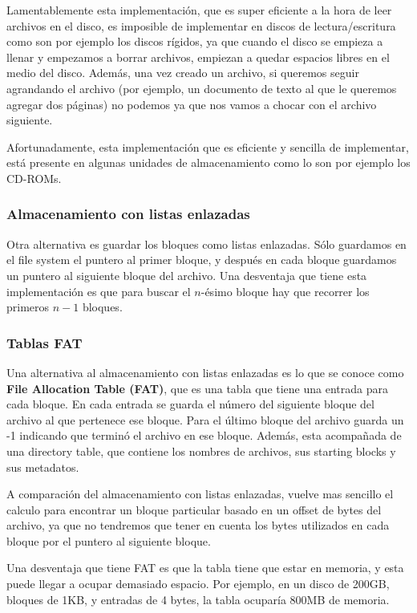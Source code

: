 \documentclass{article}
\begin{document}
Lamentablemente esta implementaci\'on, que es super eficiente a la hora de leer archivos en el disco, es imposible de implementar en discos de lectura/escritura como son por ejemplo los discos r\'igidos, ya que cuando el disco se empieza a llenar y empezamos a borrar archivos, empiezan a quedar espacios libres en el medio del disco. Adem\'as, una vez creado un archivo, si queremos seguir agrandando el archivo (por ejemplo, un documento de texto al que le queremos agregar dos p\'aginas) no podemos ya que nos vamos a chocar con el archivo siguiente.

Afortunadamente, esta implementaci\'on que es eficiente y sencilla de implementar, est\'a presente en algunas unidades de almacenamiento como lo son por ejemplo los CD-ROMs.

\subsubsection{Almacenamiento con listas enlazadas}

Otra alternativa es guardar los bloques como listas enlazadas. S\'olo guardamos en el file system el puntero al primer bloque, y despu\'es en cada bloque guardamos un puntero al siguiente bloque del archivo. Una desventaja que tiene esta implementaci\'on es que para buscar el $n$-\'esimo bloque hay que recorrer los primeros $n-1$ bloques.

\subsubsection{Tablas FAT}

Una alternativa al almacenamiento con listas enlazadas es lo que se conoce como \textbf{File Allocation Table (FAT)}, que es una tabla que tiene una entrada para cada bloque. En cada entrada se guarda el n\'umero del siguiente bloque del archivo al que pertenece ese bloque. Para el \'ultimo bloque del archivo guarda un -1 indicando que termin\'o el archivo en ese bloque. Además, esta acompañada de una directory table, que contiene los nombres de archivos, sus starting blocks y sus metadatos.

A comparación del almacenamiento con listas enlazadas, vuelve mas sencillo el calculo para encontrar un bloque particular basado en un offset de bytes del archivo, ya que no tendremos que tener en cuenta los bytes utilizados en cada bloque por el puntero al siguiente bloque.

Una desventaja que tiene FAT es que la tabla tiene que estar en memoria, y esta puede llegar a ocupar demasiado espacio. Por ejemplo, en un disco de 200GB, bloques de 1KB, y entradas de 4 bytes, la tabla ocupar\'ia 800MB de memoria.
\end{document}
